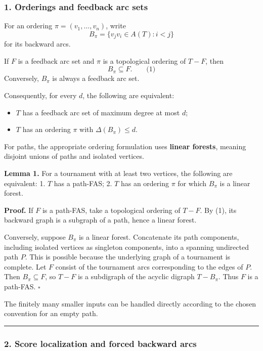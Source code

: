\documentclass[
  11pt,
  a4paper,
]{article}
\providecommand{\tightlist}{%
  \setlength{\itemsep}{0pt}\setlength{\parskip}{0pt}}
\begin{document}
\subsubsection{1. Orderings and feedback arc
sets}\label{orderings-and-feedback-arc-sets}

For an ordering \(\pi=(v_1,\ldots,v_n)\), write \[
B_\pi=\{v_jv_i\in A(T):i<j\}
\] for its backward arcs.

If \(F\) is a feedback arc set and \(\pi\) is a topological ordering of
\(T-F\), then \[
B_\pi\subseteq F. \qquad\text{(1)}
\] Conversely, \(B_\pi\) is always a feedback arc set.

Consequently, for every \(d\), the following are equivalent:

\begin{itemize}
\tightlist
\item
  \(T\) has a feedback arc set of maximum degree at most \(d\);
\item
  \(T\) has an ordering \(\pi\) with \(\Delta(B_\pi)\le d\).
\end{itemize}

For paths, the appropriate ordering formulation uses \textbf{linear
forests}, meaning disjoint unions of paths and isolated vertices.

\textbf{Lemma 1.} For a tournament with at least two vertices, the
following are equivalent: 1. \(T\) has a path-FAS; 2. \(T\) has an
ordering \(\pi\) for which \(B_\pi\) is a linear forest.

\textbf{Proof.} If \(F\) is a path-FAS, take a topological ordering of
\(T-F\). By (1), its backward graph is a subgraph of a path, hence a
linear forest.

Conversely, suppose \(B_\pi\) is a linear forest. Concatenate its path
components, including isolated vertices as singleton components, into a
spanning undirected path \(P\). This is possible because the underlying
graph of a tournament is complete. Let \(F\) consist of the tournament
arcs corresponding to the edges of \(P\). Then \(B_\pi\subseteq F\), so
\(T-F\) is a subdigraph of the acyclic digraph \(T-B_\pi\). Thus \(F\)
is a path-FAS. \(\square\)

The finitely many smaller inputs can be handled directly according to
the chosen convention for an empty path.

\begin{center}\rule{0.5\linewidth}{0.5pt}\end{center}

\subsubsection{2. Score localization and forced backward
arcs}\label{score-localization-and-forced-backward-arcs}
\end{document}
